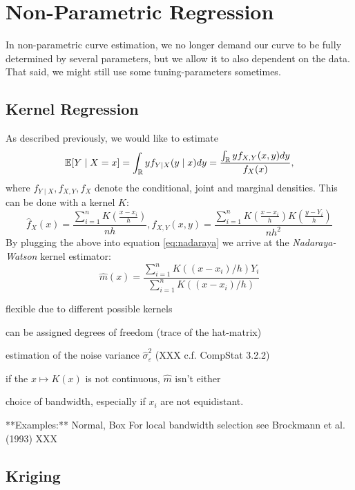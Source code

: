 \section{Non-Parametric Regression}
In non-parametric curve estimation, we no longer demand our curve to be fully determined by several parameters, but we allow it to also dependent on the data. That said, we might still use some tuning-parameters sometimes.
\subsection{Kernel Regression}
\label{sec:Kernel}
As described previously, we would like to estimate
\begin{equation}
	\label{eq:nadaraya}
	\mathbb{E}[Y \mid X=x]
	= \int_{\mathbb{R}} y f_{Y \mid X}(y \mid x) d y
	=\frac{\int_{\mathbb{R}} y f_{X, Y}(x, y) d y}{f_{X}(x)},
\end{equation}
where $f_{Y \mid X}, f_{X, Y}, f_{X}$ denote the conditional, joint and marginal densities.
This can be done with a kernel $K$:
$$
	\hat{f}_{X}(x)=\frac{\sum_{i=1}^{n} K\left(\frac{x-x_{i}}{h}\right)}{n h}, \hat{f}_{X, Y}(x, y)=\frac{\sum_{i=1}^{n} K\left(\frac{x-x_{i}}{h}\right) K\left(\frac{y-Y_{i}}{h}\right)}{n h^{2}}
$$
By plugging the above into equation \ref{eq:nadaraya} we arrive at the \textit{Nadaraya-Watson} kernel estimator:
$$\hat{m}(x)=\frac{\sum_{i=1}^{n} K\left(\left(x-x_{i}\right) / h\right) Y_{i}}{\sum_{i=1}^{n} K\left(\left(x-x_{i}\right) / h\right)}$$


\begin{my_pros_cons_table}{
		\item flexible due to different possible kernels
		\item can be assigned degrees of freedom (trace of the hat-matrix)
		\item estimation of the noise variance $\hat \sigma_\varepsilon^2$ (XXX c.f. CompStat 3.2.2)
	}{
		\item if the $x \mapsto K(x)$ is not continuous, $\hat m $ isn't either
		\item choice of bandwidth, especially if $x_i$ are not equidistant.
	}
\end{my_pros_cons_table}


**Examples:**
Normal, Box
For local bandwidth selection see Brockmann et al. (1993) XXX


\subsection{Kriging}
\label{sec:Kriging}

